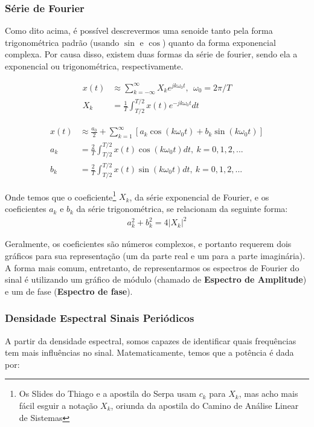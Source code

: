 \documentclass{article}
\newcommand{\n}{\nonumber \\ }
\begin{document}
\subsubsection{Série de Fourier}

Como dito acima, é possível descrevermos uma senoide tanto pela forma trigonométrica padrão (usando $\sin $ e $\cos$) quanto da forma exponencial complexa. Por causa disso, existem duas formas da série de fourier, sendo ela a exponencial ou trigonométrica, respectivamente.

\begin{minipage}{0.4\textwidth}
    \centering
    \begin{align}
        x(t) &\approx \sum^\infty_{k = -\infty}X_k e^{jk\omega_0 t}, \ \ \omega_0 = 2\pi / T \n
        X_k &= \frac{1}{T}\int^{T/2}_{T/2}x(t) e^{-jk\omega_0t}dt
    \end{align}
\end{minipage}
\begin{minipage}{0.5\textwidth}
    \centering
    \begin{align}
        x(t) &\approx \frac{a_0}{2} + \sum ^\infty _{k=1}[a_k \cos{(k\omega_0t) + b_k \sin{(k\omega_0t)}}] \n
        a_k &= \frac{2}{T}\int^{T/2}_{T/2}x(t) \cos{(k\omega_0t)} dt, \ k = 0, 1, 2, ... \n
        b_k &= \frac{2}{T}\int^{T/2}_{T/2}x(t) \sin{(k\omega_0t)} dt, \ k = 0, 1, 2, ...
    \end{align}
\end{minipage}

Onde temos que o coeficiente\footnote{Os Slides do Thiago e a apostila do Serpa usam $c_k$ para $X_k$, mas acho mais fácil esguir a notação $X_k$, oriunda da apostila do Camino de Análise Linear de Sistemas} $X_k$, da série exponencial de Fourier, e os coeficientes $a_k$ e $b_k$ da série trigonométrica, se relacionam da seguinte forma: 
\begin{align}
    a_k^2 + b_k^2 = 4|X_k|^2
\end{align}

Geralmente, os coeficientes são números complexos, e portanto requerem dois gráficos para sua representação (um da parte real e um para a parte imaginária). A forma mais comum, entretanto, de representarmos os espectros de Fourier do sinal é utilizando um gráfico de módulo (chamado de \textbf{Espectro de Amplitude}) e um de fase (\textbf{Espectro de fase}).

\newpage
\subsubsection{Densidade Espectral Sinais Periódicos}
A partir da densidade espectral, somos capazes de identificar quais frequências tem mais influências no sinal. Matematicamente, temos que a potência é dada por:
\end{document}
